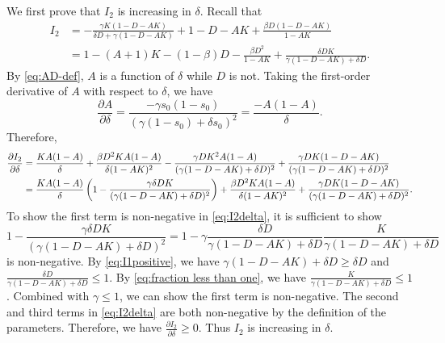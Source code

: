 \documentclass[nonblindrev, copyedit]{informs3a}
\newcounter{prop}[chapter]
\begin{document}
We first prove that $I_2$ is increasing in $\delta$.
Recall that
\begin{align*}
I_2&=-\frac{\gamma K(1-D-AK)}{\delta D+\gamma(1-D-AK)}+1-D-AK+\frac{\beta D(1-D-AK)}{1-AK}\\
&=1-(A+1)K-(1-\beta)D-\frac{\beta D^2}{1-AK}+\frac{\delta DK}{\gamma(1-D-AK)+\delta D}.
\end{align*}
By \eqref{eq:AD-def}, $A$ is a function of $\delta$ while $D$ is not. Taking the first-order derivative of $A$ with respect to $\delta$, we have
\begin{equation}\label{eq:Adelta-deriv}
   \frac{\partial A}{\partial\delta}=\frac{-\gamma s_0(1-s_0)}{(\gamma(1-s_0)+\delta s_0)^2}=\frac{-A(1-A)}{\delta}.
\end{equation}
Therefore,
\begin{align}
\frac{\partial I_2}{\partial \delta}&=\frac{KA(1-A)}{\delta}+\frac{\beta D^2KA(1-A)}{\delta(1-AK)^2}-\frac{\gamma DK^2A(1-A)}{(\gamma(1-D-AK)+\delta D)^2}+\frac{\gamma DK(1-D-AK)}{(\gamma(1-D-AK)+\delta D)^2}\notag\\
&=\frac{KA(1-A)}{\delta}\left(1-\frac{\gamma\delta DK}{(\gamma(1-D-AK)+\delta D)^2}\right)+\frac{\beta D^2 KA(1-A)}{\delta(1-AK)^2}+\frac{\gamma DK(1-D-AK)}{(\gamma(1-D-AK)+\delta D)^2}.\label{eq:I2delta}
\end{align}
To show the first term is non-negative in \eqref{eq:I2delta}, it is sufficient to show
\begin{equation}
\label{eq:postive}
1-\frac{\gamma\delta DK}{(\gamma(1-D-AK)+\delta D)^2}=1-\gamma\frac{\delta D}{\gamma(1-D-AK)+\delta D}\frac{K}{\gamma(1-D-AK)+\delta D}
\end{equation}
is non-negative.
By \eqref{eq:I1positive}, we have $\gamma(1-D-AK)+\delta D\ge \delta D$ and $\frac{\delta D}{\gamma(1-D-AK)+\delta D}\le 1$.
By \eqref{eq:fraction less than one}, we have $\frac{K}{\gamma(1-D-AK)+\delta D}\le 1$. Combined with $\gamma\le 1$, we can show the first term is non-negative.
The second and third terms in \eqref{eq:I2delta} are both non-negative by the definition of the parameters.
Therefore, we have $\frac{\partial I_2}{\partial \delta}\ge0$. Thus $I_2$ is increasing in $\delta$.
\end{document}
